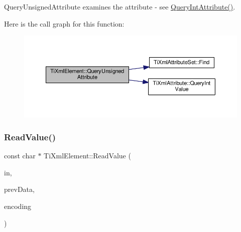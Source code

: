 Query\+Unsigned\+Attribute examines the attribute -\/ see \hyperlink{class_ti_xml_element_a5c0f739e0f6f5905a201364532e54a60}{Query\+Int\+Attribute()}. 

Here is the call graph for this function\+:
\nopagebreak
\begin{figure}[H]
\begin{center}
\leavevmode
\includegraphics[width=350pt]{class_ti_xml_element_ab75c83543d4ace62f4c40d7e8e392fc3_cgraph}
\end{center}
\end{figure}
\mbox{\label{class_ti_xml_element_ac786bce103042d3837c4cc2ff6967d41}} 
\subsubsection{\texorpdfstring{Read\+Value()}{ReadValue()}}
{\footnotesize\ttfamily const char $\ast$ Ti\+Xml\+Element\+::\+Read\+Value (\begin{DoxyParamCaption}\item[{const char $\ast$}]{in,  }\item[{\hyperlink{class_ti_xml_parsing_data}{Ti\+Xml\+Parsing\+Data} $\ast$}]{prev\+Data,  }\item[{\hyperlink{tinyxml_8h_a88d51847a13ee0f4b4d320d03d2c4d96}{Ti\+Xml\+Encoding}}]{encoding }\end{DoxyParamCaption})\hspace{0.3cm}{\ttfamily [protected]}}

